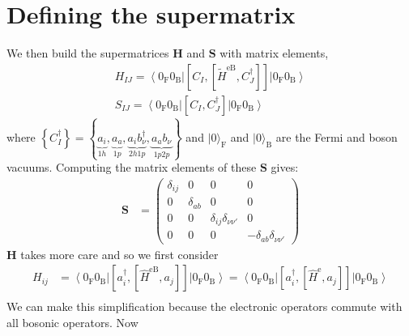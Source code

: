 \section{Defining the supermatrix}
We then build the supermatrices $\mathbf{H}$ and $\mathbf{S}$ with matrix elements,
$$
\begin{gathered}
H_{I J}=\left\langle 0_{\mathrm{F}} 0_{\mathrm{B}}\right|\left[C_I,\left[\tilde{H}^{\mathrm{eB}}, C_J^{\dagger}\right]\right]\left|0_{\mathrm{F}} 0_{\mathrm{B}}\right\rangle \\
S_{I J}=\left\langle 0_{\mathrm{F}} 0_{\mathrm{B}}\right|\left[C_I, C_J^{\dagger}\right]\left|0_{\mathrm{F}} 0_{\mathrm{B}}\right\rangle
\end{gathered}
$$
where $\left\{C_I^{\dagger}\right\}=\left\{\underbrace{a_i}_{1h}, \underbrace{a_a}_{1p}, \underbrace{a_i b_\nu^{\dagger}}_{2h1p}, \underbrace{a_a b_\nu}_{1p2p}\right\}$ and $|0\rangle_{\mathrm{F}}$ and $|0\rangle_{\mathrm{B}}$ are the Fermi and boson vacuums. Computing the matrix elements of these $\bm{S}$ gives:
\begin{align}
\bm{S} &= \begin{pmatrix}
    \delta_{ij} & 0 & 0 & 0 \\
    0 & \delta_{ab} & 0 & 0 \\
    0 & 0 & \delta_{ij}\delta_{\nu\nu'} & 0 \\
    0 & 0 & 0 & -\delta_{ab}\delta_{\nu\nu'}
\end{pmatrix}
\end{align}
$\bm{H}$ takes more care and so we first consider
\begin{equation}
\begin{split}
    H_{ij} &= \left\langle 0_{\mathrm{F}} 0_{\mathrm{B}}\right|\left[a_i^\dag, \left[\hat{H}^{\mathrm{eB}}, a_j\right]\right]\left|0_{\mathrm{F}} 0_{\mathrm{B}}\right\rangle = \left\langle 0_{\mathrm{F}} 0_{\mathrm{B}}\right|\left[a_i^\dag, \left[\hat{H}^{\mathrm{e}}, a_j\right]\right]\left|0_{\mathrm{F}} 0_{\mathrm{B}}\right\rangle \\
\end{split}
\end{equation}
We can make this simplification because the electronic operators commute with all bosonic operators. Now
